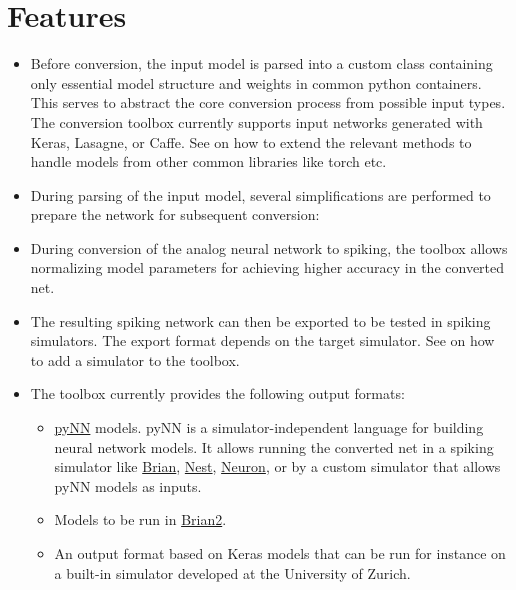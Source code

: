 \documentclass[letterpaper,10pt,english]{sphinxmanual}
\begin{document}
\chapter{Features}
\label{index:features}\begin{itemize}
\item {} 
Before conversion, the input model is parsed into a custom class containing only essential model structure and
weights in common python containers. This serves to abstract the core conversion process from possible input types.
The conversion toolbox currently supports input networks generated with Keras, Lasagne, or Caffe.
See {\hyperref[getting_started::doc]{}} on how to extend the relevant methods to handle models from other
common libraries like torch etc.

\item {} 
During parsing of the input model, several simplifications are performed to prepare the network for subsequent conversion:

\item {} 
During conversion of the analog neural network to spiking, the toolbox allows normalizing model parameters
for achieving higher accuracy in the converted net.

\item {} 
The resulting spiking network can then be exported to be tested in spiking simulators. The export format depends on the target
simulator. See {\hyperref[getting_started::doc]{}} on how to add a simulator to the toolbox.

\item {} 
The toolbox currently provides the following output formats:
\begin{itemize}
\item {} 
\href{http://neuralensemble.org/docs/PyNN/}{pyNN} models. pyNN is a simulator-independent language for building neural network
models. It allows running the converted net in a spiking simulator like \href{http://briansimulator.org/}{Brian},
\href{http://www.nest-simulator.org/}{Nest}, \href{https://www.neuron.yale.edu/neuron/}{Neuron},
or by a custom simulator that allows pyNN models as inputs.

\item {} 
Models to be run in \href{http://brian2.readthedocs.io/en/latest/index.html\#}{Brian2}.

\item {} 
An output format based on Keras models that can be run for instance on a built-in simulator developed at the University of Zurich.


\end{itemize}
\end{itemize}
\end{document}
